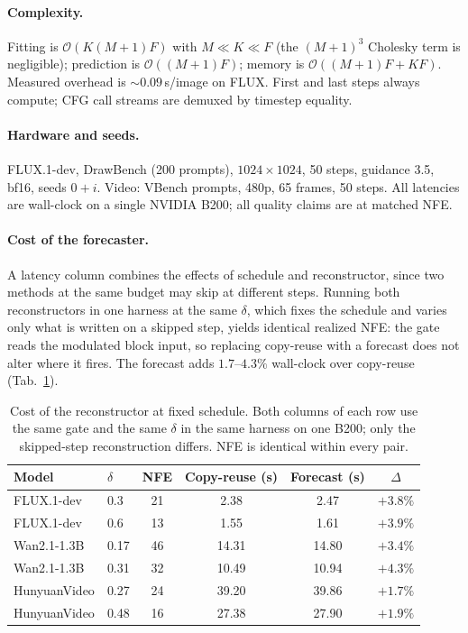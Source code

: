 \paragraph{Complexity.} Fitting is $\mathcal{O}(K(M{+}1)F)$ with
$M \ll K \ll F$ (the $(M{+}1)^3$ Cholesky term is negligible);
prediction is $\mathcal{O}((M{+}1)F)$; memory is
$\mathcal{O}((M{+}1)F + KF)$. Measured overhead is ${\sim}0.09$\,s/image
on FLUX. First and last steps always compute; CFG call streams are
demuxed by timestep equality.

\paragraph{Hardware and seeds.} FLUX.1-dev, DrawBench (200 prompts),
$1024{\times}1024$, 50 steps, guidance 3.5, bf16, seeds $0{+}i$.
Video: VBench prompts, 480p, 65 frames, 50 steps. All latencies are
wall-clock on a single NVIDIA B200; all quality claims are at matched NFE.

\paragraph{Cost of the forecaster.} A latency column combines the
effects of schedule and reconstructor, since two methods at the same budget
may skip at different steps. Running both reconstructors in one harness
at the same $\delta$, which fixes the schedule and varies only what is
written on a skipped step, yields identical realized NFE: the gate reads
the modulated block input, so replacing copy-reuse with a forecast does
not alter where it fires. The forecast adds $1.7$--$4.3\%$ wall-clock
over copy-reuse (Tab.~\ref{tab:overhead}).

\begin{table}[h]
  \centering
  \caption{Cost of the reconstructor at fixed schedule. Both columns of each
  row use the same gate and the same $\delta$ in the same harness on one
  B200; only the skipped-step reconstruction differs. NFE is identical
  within every pair.}
  \label{tab:overhead}
  \vspace{0.1cm}
  {\small\setlength{\tabcolsep}{5pt}
  \begin{tabular}{llcccc}
    \toprule
    Model & $\delta$ & NFE & Copy-reuse (s) & Forecast (s) & $\Delta$ \\
    \midrule
    FLUX.1-dev   & 0.3  & 21 & 2.38  & 2.47  & $+3.8\%$ \\
    FLUX.1-dev   & 0.6  & 13 & 1.55  & 1.61  & $+3.9\%$ \\
    Wan2.1-1.3B  & 0.17 & 46 & 14.31 & 14.80 & $+3.4\%$ \\
    Wan2.1-1.3B  & 0.31 & 32 & 10.49 & 10.94 & $+4.3\%$ \\
    HunyuanVideo & 0.27 & 24 & 39.20 & 39.86 & $+1.7\%$ \\
    HunyuanVideo & 0.48 & 16 & 27.38 & 27.90 & $+1.9\%$ \\
    \bottomrule
  \end{tabular}}
\end{table}

